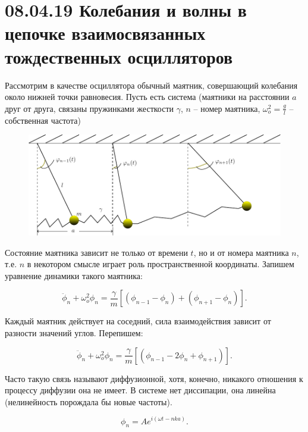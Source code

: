 
\usepackage{graphicx}
\usepackage{wrapfig}
\usepackage{ dsfont }
\usepackage{cancel}

\tableofcontents\newpage
\section{08.04.19 Колебания и волны в цепочке взаимосвязанных тождественных осцилляторов}

Рассмотрим в качестве осциллятора обычный маятник, совершающий колебания около нижней точки равновесия. Пусть есть система (маятники на расстоянии $a$ друг от друга, связаны пружинками жесткости $\gamma$, $n$ -- номер маятника, $\omega_o^2=\frac{g}{l}$ -- собственная частота)

\begin{figure}[h!]
	\centering
	\includegraphics[width=0.5\linewidth]{fig/fig1'.pdf}
	\label{fig:fig1}
\end{figure}

Состояние маятника зависит не только от времени $t$, но и от номера маятника $n$, т.е. $n$ в некотором смысле играет роль пространственной координаты. Запишем уравнение динамики такого маятника:

\begin{equation}
	\ddot{\phi}_n+\omega^2_o \phi_n=\frac{\gamma}{m}[(\phi_{n-1}-\phi_n)+(\phi_{n+1}-\phi_n)].
	\label{eq:1}
\end{equation}

Каждый маятник действует на соседний, сила взаимодействия зависит от разности значений углов. Перепишем:

\begin{equation*}
	\ddot{\phi}_n+\omega^2_o \phi_n=\frac{\gamma}{m}[(\phi_{n-1}-2\phi_n+\phi_{n+1})].
\end{equation*}

Часто такую связь называют диффузионной, хотя, конечно, никакого отношения к процессу диффузии она не имеет. В системе нет диссипации, она линейна (нелинейность порождала бы новые частоты).

\begin{equation}
	\phi_n=A e^{i(\omega t-nka)}.
	\label{eq:2}
\end{equation}

